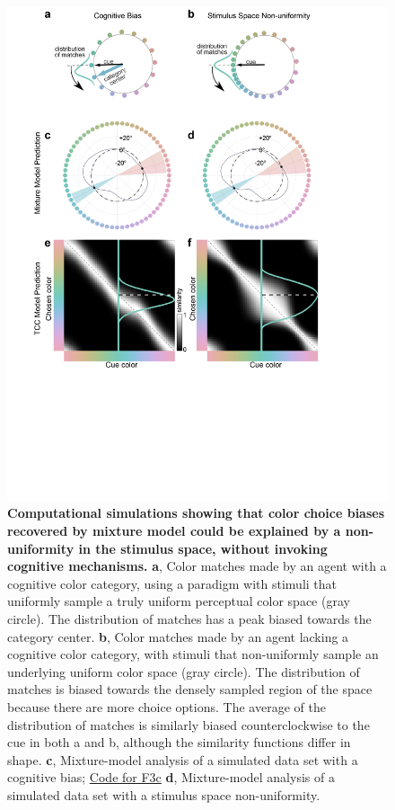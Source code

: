 \documentclass[9pt,biorxiv,lineno,onehalfspacing]{lapreprint}
\begin{document}
\begin{refsection}
\begin{figure}
    \begin{fullwidth}
    \centering
    \includegraphics[width=\textwidth,trim={0 7cm 0 0},clip]{F3_TCCModel_7.pdf}
    \caption{\textbf{Computational simulations showing that color choice biases recovered by mixture model \citep{zhang_discrete_2008, bae_why_2015} could be explained by a non-uniformity in the stimulus space, without invoking cognitive mechanisms.} 
    \textbf{a}, Color matches made by an agent with a cognitive color category, using a paradigm with stimuli that uniformly sample a truly uniform perceptual color space (gray circle). 
    The distribution of matches has a peak biased towards the category center.
    \textbf{b}, Color matches made by an agent lacking a cognitive color category, with stimuli that non-uniformly sample an underlying uniform color space (gray circle). 
    The distribution of matches is biased towards the densely sampled region of the space because there are more choice options. 
    The average of the distribution of matches is similarly biased counterclockwise to the cue in both a and b, although the similarity functions differ in shape. \textbf{c}, Mixture-model analysis of a simulated data set with a cognitive bias; \href{https://github.com/NEI-LSR/MacaqueColorCategories/blob/main/Outputs/Paper/Figures/working/F3_TCCModel/Code/F3ace_TCCModel_OffsetGaussian.m}{Code for F3c} \textbf{d}, Mixture-model analysis of a simulated data set with a stimulus space non-uniformity. 
}
\end{fullwidth}
\end{figure}
\end{refsection}
\end{document}
